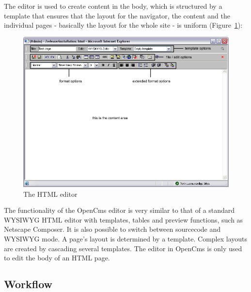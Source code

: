 The editor is used to create content in the body, which is
structured by a template that ensures that the layout for the
navigator, the content and the individual pages - basically the
layout for the whole site - is uniform
(Figure~\ref{thehtmleditor}):

\begin{figure}[!hbt]
\begin{center}
\includegraphics[width=\sgw]
                   {pics/usermanual/theHtmlEditor}
\caption[The HTML editor]
           {The HTML editor}
\label{thehtmleditor}
\end{center}
\end{figure}

The functionality of the OpenCms editor is very similar to that of
a standard WYSIWYG HTML editor with templates, tables and preview
functions, such as Netscape Composer. It is also possible to
switch between sourcecode and WYSIWYG mode. A page's layout is
determined by a template. Complex layouts are created by cascading
several templates. The editor in OpenCms is only used to edit the body of an HTML page.

\subsection{Workflow}

